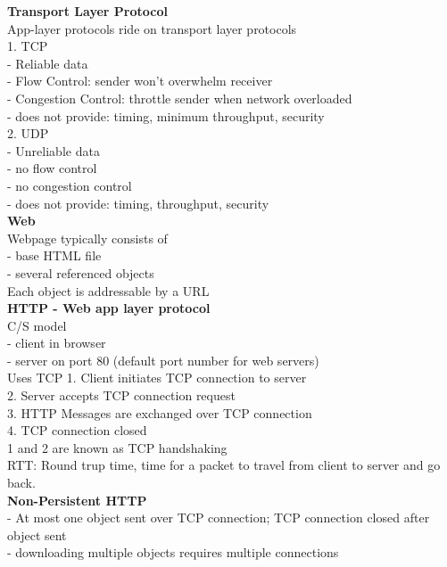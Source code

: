 \documentclass[10pt, a4paper]{article}
\newcommand{\red}[1]{{\color{red}#1}}
\begin{document}
\begin{multicols*}{3}
		\textbf{Transport Layer Protocol}\\
		App-layer protocols ride on transport layer protocols\\

		1. TCP\\
		- Reliable data\\
		- Flow Control: sender won't overwhelm receiver\\
		- Congestion Control: throttle sender when network overloaded\\
		- does not provide: \red{timing, minimum throughput, security}\\

		2. UDP\\
		- Unreliable data\\
		- no flow control\\
		- no congestion control\\
		- does not provide: timing, throughput, security\\

		\textbf{Web}\\
		Webpage typically consists of\\
		- base HTML file\\
		- several referenced objects\\
		Each object is addressable by a \red{URL}\\

		\textbf{HTTP - Web app layer protocol}\\
		C/S model\\
		- client in browser\\
		- server on port 80 (default port number for web servers)\\
		Uses TCP
		1. Client initiates TCP connection to server\\
		2. Server accepts TCP connection request\\
		3. HTTP Messages are exchanged over TCP connection\\
		4. TCP connection closed\\
		1 and 2 are known as \red{TCP handshaking}\\
		\red{RTT}: Round trup time, time for a packet to travel from client to server and go back.\\

		\textbf{Non-Persistent HTTP}\\
		- At most one object sent over TCP connection; TCP connection closed after object sent\\
		- downloading multiple objects requires multiple connections\\


\end{multicols*}
\end{document}
